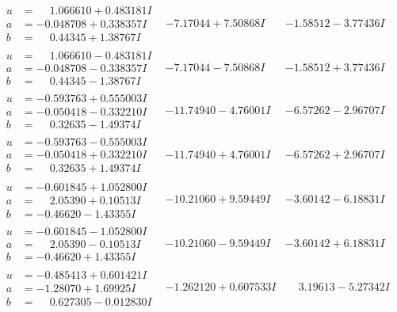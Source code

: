 \documentclass[1p]{elsarticle_modified}
\theoremstyle{definition}
\begin{document}
$$\begin{array}{c|c|c}
\begin{aligned}
u &= \phantom{-}1.066610 + 0.483181 I \\
a &= -0.048708 + 0.338357 I \\
b &= \phantom{-}0.44345 + 1.38767 I\end{aligned}
 & -7.17044 + 7.50868 I & -1.58512 - 3.77436 I \\ \hline\begin{aligned}
u &= \phantom{-}1.066610 - 0.483181 I \\
a &= -0.048708 - 0.338357 I \\
b &= \phantom{-}0.44345 - 1.38767 I\end{aligned}
 & -7.17044 - 7.50868 I & -1.58512 + 3.77436 I \\ \hline\begin{aligned}
u &= -0.593763 + 0.555003 I \\
a &= -0.050418 - 0.332210 I \\
b &= \phantom{-}0.32635 - 1.49374 I\end{aligned}
 & -11.74940 - 4.76001 I & -6.57262 - 2.96707 I \\ \hline\begin{aligned}
u &= -0.593763 - 0.555003 I \\
a &= -0.050418 + 0.332210 I \\
b &= \phantom{-}0.32635 + 1.49374 I\end{aligned}
 & -11.74940 + 4.76001 I & -6.57262 + 2.96707 I \\ \hline\begin{aligned}
u &= -0.601845 + 1.052800 I \\
a &= \phantom{-}2.05390 + 0.10513 I \\
b &= -0.46620 - 1.43355 I\end{aligned}
 & -10.21060 + 9.59449 I & -3.60142 - 6.18831 I \\ \hline\begin{aligned}
u &= -0.601845 - 1.052800 I \\
a &= \phantom{-}2.05390 - 0.10513 I \\
b &= -0.46620 + 1.43355 I\end{aligned}
 & -10.21060 - 9.59449 I & -3.60142 + 6.18831 I \\ \hline\begin{aligned}
u &= -0.485413 + 0.601421 I \\
a &= -1.28070 + 1.69925 I \\
b &= \phantom{-}0.627305 - 0.012830 I\end{aligned}
 & -1.262120 + 0.607533 I & \phantom{-}3.19613 - 5.27342 I \\ \hline\begin{aligned}

\end{aligned}
\end{array}$$
\end{document}
